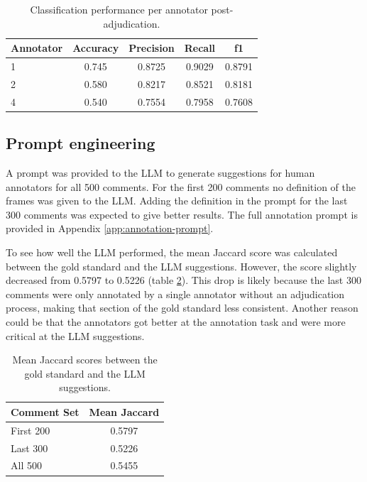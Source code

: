 \documentclass[
10pt, %
a4paper, %
oneside, %
headinclude,footinclude, %
] {book}%
\begin{document}
\begin{table}[htbp]
\centering
\begin{tabular}{lcccc}
\hline
\textbf{Annotator} & \textbf{Accuracy} & \textbf{Precision} & \textbf{Recall} & \textbf{f1} \\
\hline
1 & 0.745 & 0.8725 & 0.9029 & 0.8791 \\
2 & 0.580 & 0.8217 & 0.8521 & 0.8181 \\
4 & 0.540 & 0.7554 & 0.7958 & 0.7608 \\
\hline
\end{tabular}
\caption{Classification performance per annotator post-adjudication.}
\label{tab:post-adjudication_annotator_performance}
\end{table}

\subsection{Prompt engineering}
A prompt was provided to the LLM to generate suggestions for human annotators for all 500 comments. For the first 200 comments no definition of the frames was given to the LLM. Adding the definition in the prompt for the last 300 comments was expected to give better results. The full annotation prompt is provided in Appendix \ref{app:annotation-prompt}.

To see how well the LLM performed, the mean Jaccard score was calculated between the gold standard and the LLM suggestions. However, the score slightly decreased from 0.5797 to 0.5226 (table \ref{tab:llm_gold_jaccard_performance}). This drop is likely because the last 300 comments were only annotated by a single annotator without an adjudication process, making that section of the gold standard less consistent. Another reason could be that the annotators got better at the annotation task and were more critical at the LLM suggestions.

\begin{table}[htbp]
\centering
\begin{tabular}{lc}
\hline
\textbf{Comment Set} & \textbf{Mean Jaccard} \\
\hline
First 200    & 0.5797 \\
Last 300   & 0.5226 \\
All 500             & 0.5455 \\
\hline
\end{tabular}
\caption{Mean Jaccard scores between the gold standard and the LLM suggestions.}
\label{tab:llm_gold_jaccard_performance}
\end{table}
\end{document}
